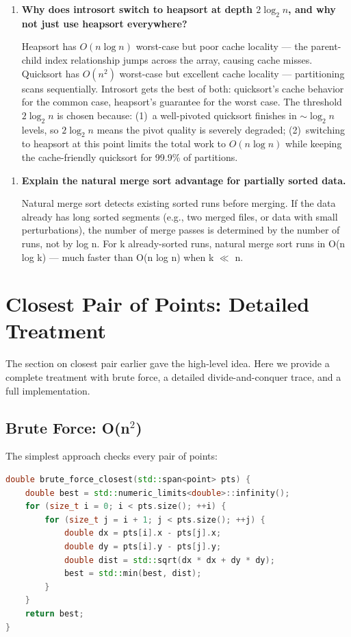 \begin{enumerate}
\item \textbf{Why does introsort switch to heapsort at depth $2 \log_{2} n$, and why not just use heapsort everywhere?}

Heapsort has $O(n \log n)$ worst-case but poor cache locality --- the parent-child index relationship jumps across the array, causing cache misses. Quicksort has $O(n^{2})$ worst-case but excellent cache locality --- partitioning scans sequentially. Introsort gets the best of both: quicksort's cache behavior for the common case, heapsort's guarantee for the worst case. The threshold $2 \log_{2} n$ is chosen because: (1)~a well-pivoted quicksort finishes in $\sim \log_{2} n$ levels, so $2 \log_{2} n$ means the pivot quality is severely degraded; (2)~switching to heapsort at this point limits the total work to $O(n \log n)$ while keeping the cache-friendly quicksort for 99.9\% of partitions.
\end{enumerate}

\begin{enumerate}
\item \textbf{Explain the natural merge sort advantage for partially sorted data.}

Natural merge sort detects existing sorted runs before merging. If the data already has long sorted segments (e.g., two merged files, or data with small perturbations), the number of merge passes is determined by the number of runs, not by log n. For k already-sorted runs, natural merge sort runs in O(n log k) — much faster than O(n log n) when k $\ll$ n.
\end{enumerate}

\section{Closest Pair of Points: Detailed Treatment}

The section on closest pair earlier gave the high-level idea. Here we provide a complete treatment with brute force, a detailed divide-and-conquer trace, and a full implementation.

\subsection{Brute Force: \texorpdfstring{O(n$^{2}$)}{O(n squared)}}

The simplest approach checks every pair of points:

\begin{lstlisting}[language=C++]
double brute_force_closest(std::span<point> pts) {
    double best = std::numeric_limits<double>::infinity();
    for (size_t i = 0; i < pts.size(); ++i) {
        for (size_t j = i + 1; j < pts.size(); ++j) {
            double dx = pts[i].x - pts[j].x;
            double dy = pts[i].y - pts[j].y;
            double dist = std::sqrt(dx * dx + dy * dy);
            best = std::min(best, dist);
        }
    }
    return best;
}
\end{lstlisting}

